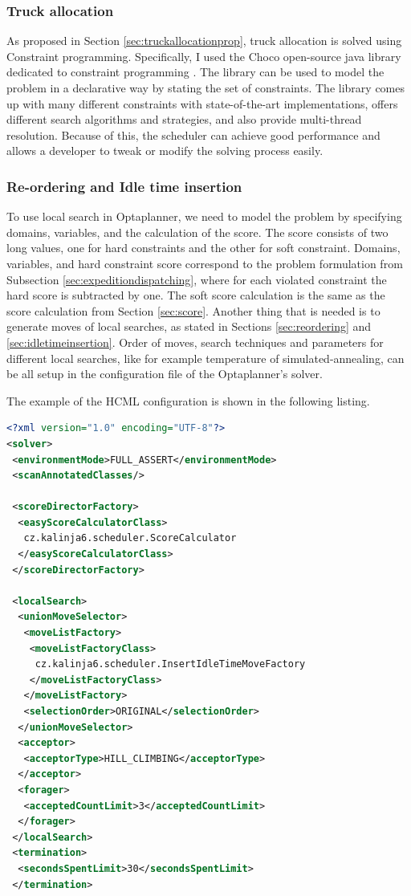 \documentclass{ctuthesis}
\begin{document}
\subsubsection{Truck allocation}

As proposed in Section \ref{sec:truckallocationprop}, truck allocation is solved using Constraint programming. Specifically, I used the Choco open-source java library dedicated to constraint programming \cite{choco}. The library can be used to model the problem in a declarative way by stating the set of constraints. The library comes up with many different constraints with state-of-the-art implementations, offers different search algorithms and strategies, and also provide multi-thread resolution. Because of this, the scheduler can achieve good performance and allows a developer to tweak or modify the solving process easily. 

\subsubsection{Re-ordering and Idle time insertion}

To use local search in Optaplanner, we need to model the problem by specifying domains, variables, and the calculation of the score. The score consists of two long values, one for hard constraints and the other for soft constraint. Domains, variables, and hard constraint score correspond to the problem formulation from Subsection \ref{sec:expeditiondispatching}, where for each violated constraint the hard score is subtracted by one. The soft score calculation is the same as the score calculation from Section \ref{sec:score}.
Another thing that is needed is to generate moves of local searches, as stated in Sections \ref{sec:reordering} and \ref{sec:idletimeinsertion}. Order of moves, search techniques and parameters for different local searches, like for example temperature of simulated-annealing, can be all setup in the configuration file of the Optaplanner's solver.

The example of the HCML configuration is shown in the following listing.


\begin{lstlisting}[language=XML, caption=Optaplanner local search configuration]
<?xml version="1.0" encoding="UTF-8"?>
<solver>
 <environmentMode>FULL_ASSERT</environmentMode>
 <scanAnnotatedClasses/>

 <scoreDirectorFactory>
  <easyScoreCalculatorClass>
   cz.kalinja6.scheduler.ScoreCalculator
  </easyScoreCalculatorClass>
 </scoreDirectorFactory>

 <localSearch>
  <unionMoveSelector>
   <moveListFactory>
    <moveListFactoryClass>
     cz.kalinja6.scheduler.InsertIdleTimeMoveFactory
    </moveListFactoryClass>
   </moveListFactory>
   <selectionOrder>ORIGINAL</selectionOrder>
  </unionMoveSelector>
  <acceptor>
   <acceptorType>HILL_CLIMBING</acceptorType>
  </acceptor>
  <forager>
   <acceptedCountLimit>3</acceptedCountLimit>
  </forager>
 </localSearch>
 <termination>
  <secondsSpentLimit>30</secondsSpentLimit>
 </termination>
\end{lstlisting}
\end{document}
